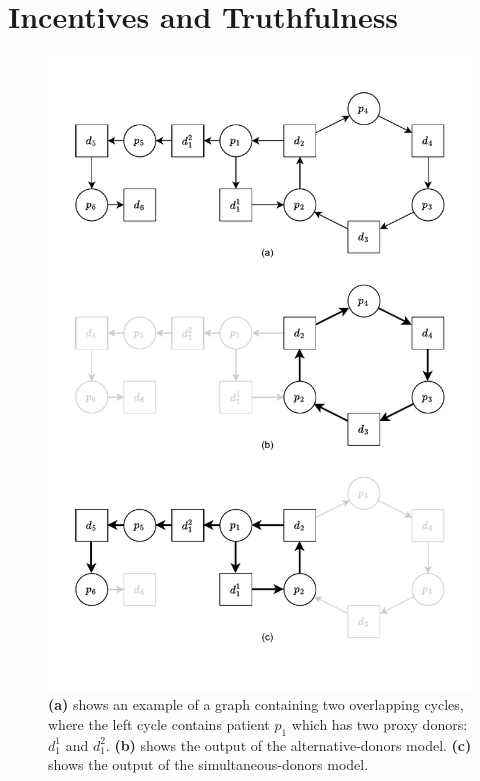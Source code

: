 \chapter{Incentives and Truthfulness}
\label{cha:incentives_and_truthfulness}

\begin{figure}
    \centering
    \includegraphics{data/incentive_motivation_example.pdf}
    \caption[An example showing the difference between alternative-donors model and simultaneous-donors model]{\textbf{(a)} shows an example of a graph containing two overlapping cycles, where the left cycle contains patient $p_1$ which has two proxy donors: $d_1^1$ and $d_1^2$. \textbf{(b)} shows the output of the alternative-donors model. \textbf{(c)} shows the output of the simultaneous-donors model.}
    \label{fig:incentive_motivation_example}
\end{figure}


